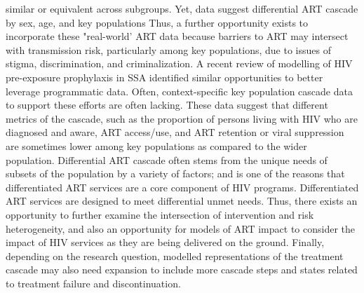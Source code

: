 similar or equivalent across subgroups. Yet, data suggest differential ART cascade by sex, age, and key populations
\cite{Mountain2014,Lancaster2016,Green2020}
Thus, a further opportunity exists to incorporate these "real-world' ART data because barriers to ART may intersect with transmission risk,
particularly among key populations, due to issues of stigma, discrimination, and criminalization.  %
\cite{Ortblad2019,Baral2019}
A recent review of modelling of HIV pre-exposure prophylaxis in SSA\cite{Case2019} %
identified similar opportunities to better leverage programmatic data.
Often, context-specific key population cascade data to support these efforts are often lacking.\cite{Mountain2014}  %
These data suggest that different metrics of the cascade, such as the proportion of persons living with HIV who are diagnosed and aware, 
ART access/use, and ART retention or viral suppression are sometimes lower among key populations as compared to the wider population. %
Differential ART cascade often stems from the unique needs of subsets of the population by a variety of factors; and
is one of the reasons that differentiated ART services are a core component of HIV programs. %
Differentiated ART services are designed to meet differential unmet needs.
Thus, there exists an opportunity to further examine the intersection of intervention and risk heterogeneity, and also 
an opportunity for models of ART impact to consider the impact of HIV services as they are being delivered on the ground.
Finally, depending on the research question, modelled representations of the treatment cascade may also need expansion
to include more cascade steps and states related to treatment failure and discontinuation.

